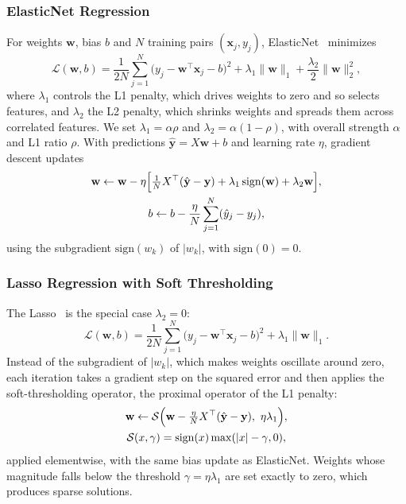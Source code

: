 \documentclass[conference]{IEEEtran}
\begin{document}
\subsubsection{ElasticNet Regression}
For weights $\mathbf w$, bias $b$ and $N$ training pairs $(\mathbf x_j, y_j)$, ElasticNet~\cite{zou2005} minimizes
\begin{equation}
\mathcal L(\mathbf w, b) = \frac{1}{2N}\sum_{j=1}^{N}\bigl(y_j - \mathbf w^\top\mathbf x_j - b\bigr)^2 + \lambda_1\lVert\mathbf w\rVert_1 + \frac{\lambda_2}{2}\lVert\mathbf w\rVert_2^2,
\end{equation}
where $\lambda_1$ controls the L1 penalty, which drives weights to zero and so selects features, and $\lambda_2$ the L2 penalty, which shrinks weights and spreads them across correlated features. We set $\lambda_1 = \alpha\rho$ and $\lambda_2 = \alpha(1-\rho)$, with overall strength $\alpha$ and L1 ratio $\rho$. With predictions $\hat{\mathbf y} = X\mathbf w + b$ and learning rate $\eta$, gradient descent updates
\begin{gather}
\mathbf w \leftarrow \mathbf w - \eta\Bigl[\tfrac{1}{N}X^\top(\hat{\mathbf y}-\mathbf y) + \lambda_1\,\mathrm{sign}(\mathbf w) + \lambda_2\mathbf w\Bigr], \nonumber\\
b \leftarrow b - \frac{\eta}{N}\sum_{j=1}^{N}(\hat y_j - y_j),
\end{gather}
using the subgradient $\mathrm{sign}(w_k)$ of $|w_k|$, with $\mathrm{sign}(0) = 0$.

\subsubsection{Lasso Regression with Soft Thresholding}
The Lasso~\cite{tibshirani1996} is the special case $\lambda_2 = 0$:
\begin{equation}
\mathcal{L}(\mathbf w, b) = \frac{1}{2N}\sum_{j=1}^{N}\bigl(y_j - \mathbf w^\top\mathbf x_j - b\bigr)^2 + \lambda_1\lVert\mathbf w\rVert_1 .
\end{equation}
Instead of the subgradient of $|w_k|$, which makes weights oscillate around zero, each iteration takes a gradient step on the squared error and then applies the soft-thresholding operator, the proximal operator of the L1 penalty:
\begin{gather}
\mathbf w \leftarrow \mathcal S\Bigl(\mathbf w - \tfrac{\eta}{N}X^\top(\hat{\mathbf y}-\mathbf y),\ \eta\lambda_1\Bigr), \nonumber\\
\mathcal{S}(x, \gamma) = \mathrm{sign}(x)\max(|x| - \gamma, 0),
\end{gather}
applied elementwise, with the same bias update as ElasticNet. Weights whose magnitude falls below the threshold $\gamma = \eta\lambda_1$ are set exactly to zero, which produces sparse solutions.
\end{document}
